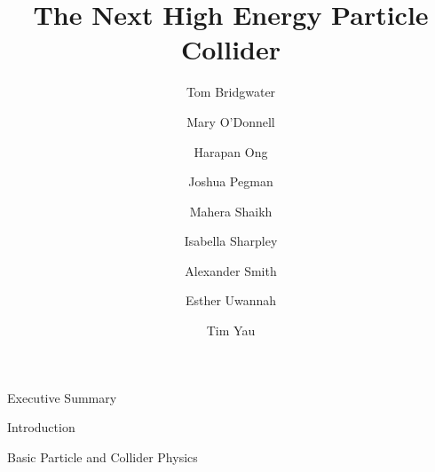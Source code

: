 \documentclass[12pt]{article}
\begin{document}
    \begin{titlepage}
    
     \author{
         Tom Bridgwater \and
         Mary O'Donnell \and
         Harapan Ong \and
         Joshua Pegman \and
         Mahera Shaikh \and
         Isabella Sharpley \and
         Alexander Smith \and
         Esther Uwannah \and
         Tim Yau
     }
     
     \title{The Next High Energy Particle Collider}
     
     \maketitle
     
    
    \end{titlepage}
 
 \clearpage
 
 \setcounter{tocdepth}{2}
 \tableofcontents
 
 \clearpage
 
 \begin{section}{Executive Summary}
 	 
 \end{section}
 
 \begin{section}{Introduction}
     
 \end{section}

 \begin{section}{Basic Particle and Collider Physics}
     
     
 \end{section}
 
\end{document}
